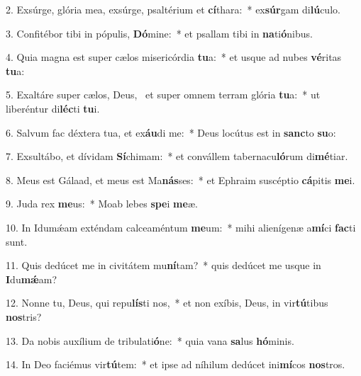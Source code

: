 2. Exsúrge, glória mea, exsúrge, psaltérium et \textbf{cí}thara:~*  ex\textbf{súr}gam di\textbf{lú}culo.\

3. Confitébor tibi in pópulis, \textbf{Dó}mine:~*  et psallam tibi in \textbf{na}ti\textbf{ó}nibus.\

4. Quia magna est super cælos misericórdia \textbf{tu}a:~*  et usque ad nubes \textbf{vé}ritas \textbf{tu}a:\

5. Exaltáre super cælos, Deus, \dag\  et super omnem terram glória \textbf{tu}a:~*  ut liberéntur di\textbf{léc}ti \textbf{tu}i.\

6. Salvum fac déxtera tua, et ex\textbf{áu}di me:~*  Deus locútus est in \textbf{sanc}to \textbf{su}o:\

7. Exsultábo, et dívidam \textbf{Sí}chimam:~*  et convállem tabernacu\textbf{ló}rum di\textbf{mé}tiar.\

8. Meus est Gálaad, et meus est Ma\textbf{nás}ses:~*  et Ephraim suscéptio \textbf{cá}pitis \textbf{me}i.\

9. Juda rex \textbf{me}us:~*  Moab lebes \textbf{spe}i \textbf{me}æ.\

10. In Idumǽam exténdam calceaméntum \textbf{me}um:~*  mihi alienígenæ a\textbf{mí}ci \textbf{fac}ti sunt.\

11. Quis dedúcet me in civitátem mu\textbf{ní}tam?~*  quis dedúcet me usque in \textbf{I}du\textbf{mǽ}am?\

12. Nonne tu, Deus, qui repu\textbf{lís}ti nos,~*  et non exíbis, Deus, in vir\textbf{tú}tibus \textbf{nos}tris?\

13. Da nobis auxílium de tribulati\textbf{ó}ne:~*  quia vana \textbf{sa}lus \textbf{hó}minis.\

14. In Deo faciémus vir\textbf{tú}tem:~*  et ipse ad níhilum dedúcet ini\textbf{mí}cos \textbf{nos}tros.\

